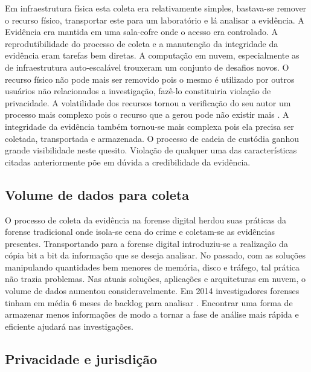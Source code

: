 Em infraestrutura física esta coleta era relativamente simples, bastava-se remover o recurso físico, transportar este para um laboratório e lá analisar a evidência. A Evidência era mantida em uma sala-cofre onde o acesso era controlado.
%
A reprodutibilidade do processo de coleta e a manutenção da integridade da evidência eram tarefas bem diretas.
%
A computação em nuvem, especialmente as de infraestrutura auto-escalável trouxeram um conjunto de desafios novos. O recurso físico não pode mais ser removido pois o mesmo é utilizado por outros usuários não relacionados a investigação, fazê-lo constituiria violação de privacidade.
%
A volatilidade dos recursos tornou a verificação do seu autor um processo mais complexo pois o recurso que a gerou pode não existir mais \cite{SimouCloudChlng:2014}.
%
A integridade da evidência também tornou-se mais complexa pois ela precisa ser coletada, transportada e armazenada. O processo de cadeia de custódia ganhou grande visibilidade neste quesito.
%
Violação de qualquer uma das características citadas anteriormente põe em dúvida a credibilidade da evidência.

\subsection{Volume de dados para coleta}
\label{sec:volumedados}

O processo de coleta da evidência na forense digital herdou suas práticas da forense tradicional onde isola-se cena do crime e coletam-se as evidências presentes. 
%
Transportando para a forense digital introduziu-se a realização da cópia bit a bit da informação que se deseja analisar.
%
No passado, com as soluções manipulando quantidades bem menores de memória, disco e tráfego, tal prática não trazia problemas. Nas atuais soluções, aplicações e arquiteturas em nuvem, o volume de dados aumentou consideravelmente.
%
Em 2014 investigadores forenses tinham em média 6 meses de backlog para analisar \cite{QuickIncreaseVolumeImpact:2014}. 
%
Encontrar uma forma de armazenar menos informações de modo a tornar a fase de análise mais rápida e eficiente ajudará nas investigações.

\subsection{Privacidade e jurisdição}
\label{sec:violacaoprivacidadejuriscdicao}

